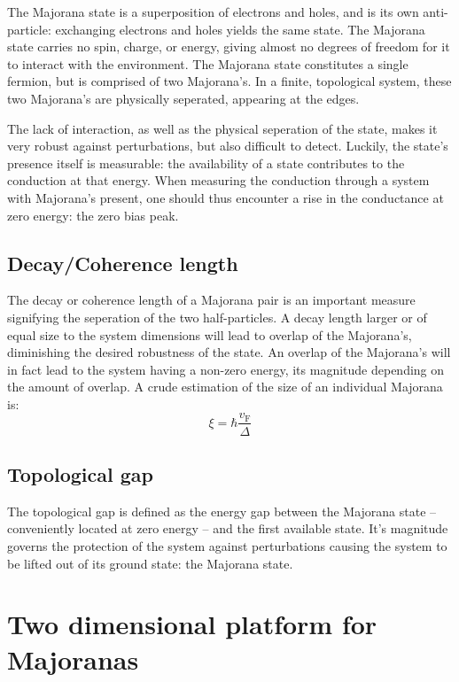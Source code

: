 		The Majorana state is a superposition of electrons and holes, and is its own anti-particle: exchanging electrons and holes yields the same state.
		The Majorana state carries no spin, charge, or energy, giving almost no degrees of freedom for it to interact with the environment.
		The Majorana state constitutes a single fermion, but is comprised of two Majorana's.
		In a finite, topological system, these two Majorana's are physically seperated, appearing at the edges.

		The lack of interaction, as well as the physical seperation of the state, makes it very robust against perturbations, but also difficult to detect.
		Luckily, the state's presence itself is measurable: the availability of a state contributes to the conduction at that energy.
		When measuring the conduction through a system with Majorana's present, one should thus encounter a rise in the conductance at zero energy: the zero bias peak.

	\subsection{Decay/Coherence length}
		The decay or coherence length of a Majorana pair is an important measure signifying the seperation of the two half-particles.
		A decay length larger or of equal size to the system dimensions will lead to overlap of the Majorana's, diminishing the desired robustness of the state.
		An overlap of the Majorana's will in fact lead to the system having a non-zero energy, its magnitude depending on the amount of overlap.
		A crude estimation of the size of an individual Majorana is:
		\begin{equation}
			\xi = \hbar \frac{v_\text{F}}{\Delta}
		\end{equation}

	\subsection{Topological gap}
		The topological gap is defined as the energy gap between the Majorana state -- conveniently located at zero energy -- and the first available state.
		It's magnitude governs the protection of the system against perturbations causing the system to be lifted out of its ground state: the Majorana state.

\section{Two dimensional platform for Majoranas}

